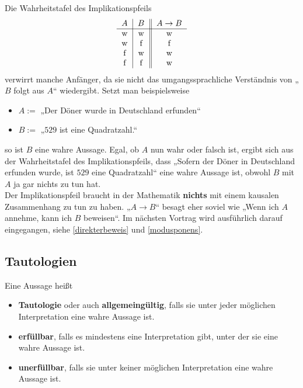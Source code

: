 \begin{bem}
 Die Wahrheitstafel des Implikationspfeils
 		\[\begin{tabular}{c|c||c}
			$A$ & $B$ &  $A\to B$  \\
			\hline
			w&w&w\\
			w&f&f\\
			f&w&w\\
			f&f&w\\
		\end{tabular}\]
 verwirrt manche Anfänger, da sie nicht das umgangssprachliche Verständnis von „$B$ folgt aus $A$“ wiedergibt. Setzt man beispielsweise
 \begin{itemize}
   \item $A:=$ „Der Döner wurde in Deutschland erfunden“
  \item $B:=$ „$529$ ist eine Quadratzahl.“
 \end{itemize}
so ist $B$ eine wahre Aussage. Egal, ob $A$ nun wahr oder falsch ist, ergibt sich aus der Wahrheitstafel des Implikationspfeils, dass „Sofern der Döner in Deutschland erfunden wurde, ist $529$ eine Quadratzahl“ eine wahre Aussage ist, obwohl $B$ mit $A$ ja gar nichts zu tun hat. \\
Der Implikationspfeil braucht in der Mathematik \textbf{nichts} mit einem kausalen Zusammenhang zu tun zu haben. „$A\to B$“ besagt eher soviel wie „Wenn ich $A$ annehme, kann ich $B$ beweisen“. Im nächsten Vortrag wird ausführlich darauf eingegangen, siehe \cref{direkterbeweis} und \cref{modusponens}. %
\end{bem}






\subsection{Tautologien}


\begin{de}
 Eine Aussage heißt
 \begin{itemize}
  \item \textbf{Tautologie} oder auch \textbf{allgemeingültig}, falls sie unter jeder möglichen Interpretation eine wahre Aussage ist.
  \item \textbf{erfüllbar}, falls es mindestens eine Interpretation gibt, unter der sie eine wahre Aussage ist.
  \item \textbf{unerfüllbar}, falls sie unter keiner möglichen Interpretation eine wahre Aussage ist.
 \end{itemize}
 \end{de}


